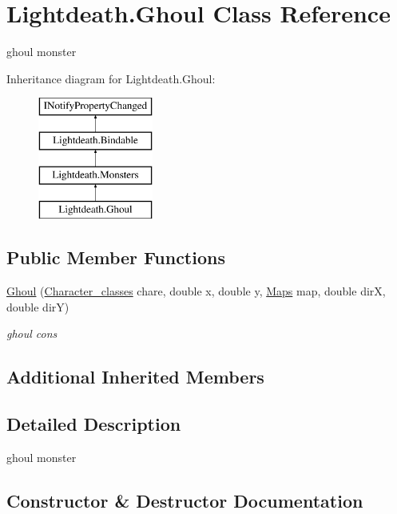 \hypertarget{class_lightdeath_1_1_ghoul}{}\section{Lightdeath.\+Ghoul Class Reference}
\label{class_lightdeath_1_1_ghoul}


ghoul monster  


Inheritance diagram for Lightdeath.\+Ghoul\+:\begin{figure}[H]
\begin{center}
\leavevmode
\includegraphics[height=4.000000cm]{class_lightdeath_1_1_ghoul}
\end{center}
\end{figure}
\subsection*{Public Member Functions}
\begin{DoxyCompactItemize}
\item 
\hyperlink{class_lightdeath_1_1_ghoul_a62d9c9f96cdfe698361d979ff819b637}{Ghoul} (\hyperlink{class_lightdeath_1_1_character__classes}{Character\+\_\+classes} chare, double x, double y, \hyperlink{class_lightdeath_1_1_maps}{Maps} map, double dirX, double dirY)
\begin{DoxyCompactList}\small\item\em ghoul cons \end{DoxyCompactList}\end{DoxyCompactItemize}
\subsection*{Additional Inherited Members}


\subsection{Detailed Description}
ghoul monster 



\subsection{Constructor \& Destructor Documentation}
\hypertarget{class_lightdeath_1_1_ghoul_a62d9c9f96cdfe698361d979ff819b637}{}\label{class_lightdeath_1_1_ghoul_a62d9c9f96cdfe698361d979ff819b637} 
